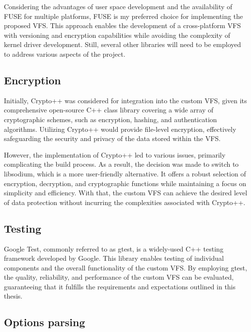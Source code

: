 Considering the advantages of user space development and the availability of FUSE for multiple platforms, FUSE is my preferred choice for implementing the proposed VFS\@.
This approach enables the development of a cross-platform VFS with versioning and encryption capabilities while avoiding the complexity of kernel driver development.
Still, several other libraries will need to be employed to address various aspects of the project.

\subsection{Encryption}\label{subsec:encryption-analysis}

Initially, Crypto++\cite{crypto_pp} was considered for integration into the custom VFS, given its comprehensive open-source C++ class library covering a wide array of cryptographic schemes, such as encryption, hashing, and authentication algorithms.
Utilizing Crypto++ would provide file-level encryption, effectively safeguarding the security and privacy of the data stored within the VFS\@.

However, the implementation of Crypto++ led to various issues, primarily complicating the build process.
As a result, the decision was made to switch to libsodium\cite{libsodium}, which is a more user-friendly alternative.
It offers a robust selection of encryption, decryption, and cryptographic functions while maintaining a focus on simplicity and efficiency.
With that, the custom VFS can achieve the desired level of data protection without incurring the complexities associated with Crypto++.

\subsection{Testing}\label{subsec:gtest}

Google Test\cite{google_test}, commonly referred to as gtest, is a widely-used C++ testing framework developed by Google.
This library enables testing of individual components and the overall functionality of the custom VFS\@.
By employing gtest, the quality, reliability, and performance of the custom VFS can be evaluated, guaranteeing that it fulfills the requirements and expectations outlined in this thesis.

\subsection{Options parsing}\label{subsec:options-parsing}

